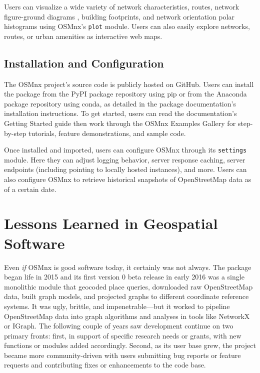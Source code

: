 \documentclass[12pt,letterpaper]{article} %
\begin{document}
Users can visualize a wide variety of network characteristics, routes, network figure-ground diagrams \citep{boeing_spatial_2021}, building footprints, and network orientation polar histograms \citep{boeing_urban_2019} using OSMnx's \texttt{plot} module. Users can also easily explore networks, routes, or urban amenities as interactive web maps.

\subsection{Installation and Configuration}

The OSMnx project's source code is publicly hosted on GitHub. Users can install the package from the PyPI package repository using pip or from the Anaconda package repository using conda, as detailed in the package documentation's installation instructions. To get started, users can read the documentation's Getting Started guide then work through the OSMnx Examples Gallery for step-by-step tutorials, feature demonstrations, and sample code.

Once installed and imported, users can configure OSMnx through its \texttt{settings} module. Here they can adjust logging behavior, server response caching, server endpoints (including pointing to locally hosted instances), and more. Users can also configure OSMnx to retrieve historical snapshots of OpenStreetMap data as of a certain date.

\section{Lessons Learned in Geospatial Software}

Even \textit{if} OSMnx is good software today, it certainly was not always. The package began life in 2015 and its first version 0 beta release in early 2016 was a single monolithic module that geocoded place queries, downloaded raw OpenStreetMap data, built graph models, and projected graphs to different coordinate reference systems. It was ugly, brittle, and impenetrable---but it worked to pipeline OpenStreetMap data into graph algorithms and analyses in tools like NetworkX or IGraph. The following couple of years saw development continue on two primary fronts: first, in support of specific research needs or grants, with new functions or modules added accordingly. Second, as its user base grew, the project became more community-driven with users submitting bug reports or feature requests and contributing fixes or enhancements to the code base.
\end{document}
